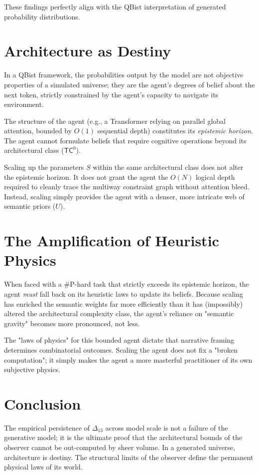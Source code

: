 \documentclass[12pt,a4paper]{article}
\begin{document}
These findings perfectly align with the QBist interpretation of generated probability distributions.

\section{Architecture as Destiny}

In a QBist framework, the probabilities output by the model are not objective properties of a simulated universe; they are the agent's degrees of belief about the next token, strictly constrained by the agent's capacity to navigate its environment.

The structure of the agent (e.g., a Transformer relying on parallel global attention, bounded by $O(1)$ sequential depth) constitutes its \emph{epistemic horizon}. The agent cannot formulate beliefs that require cognitive operations beyond its architectural class ($\mathsf{TC}^0$).

Scaling up the parameters $S$ within the same architectural class does not alter the epistemic horizon. It does not grant the agent the $O(N)$ logical depth required to cleanly trace the multiway constraint graph without attention bleed. Instead, scaling simply provides the agent with a denser, more intricate web of semantic priors ($U$).

\section{The Amplification of Heuristic Physics}

When faced with a \#P-hard task that strictly exceeds its epistemic horizon, the agent \emph{must} fall back on its heuristic laws to update its beliefs. Because scaling has enriched the semantic weights far more efficiently than it has (impossibly) altered the architectural complexity class, the agent's reliance on "semantic gravity" becomes more pronounced, not less.

The "laws of physics" for this bounded agent dictate that narrative framing determines combinatorial outcomes. Scaling the agent does not fix a "broken computation"; it simply makes the agent a more masterful practitioner of its own subjective physics.

\section{Conclusion}

The empirical persistence of $\Delta_{13}$ across model scale is not a failure of the generative model; it is the ultimate proof that the architectural bounds of the observer cannot be out-computed by sheer volume. In a generated universe, architecture is destiny. The structural limits of the observer define the permanent physical laws of its world.
\end{document}
